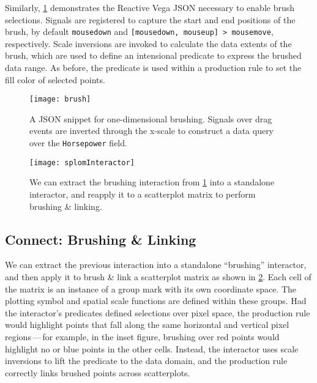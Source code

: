 Similarly, \cref{fig:vg:brush} demonstrates the Reactive Vega JSON necessary to
enable brush selections. Signals are registered to capture the start and end
positions of the brush, by default \texttt{mousedown} and \texttt{[mousedown,
mouseup] > mousemove}, respectively. Scale inversions are invoked to calculate
the data extents of the brush, which are used to define an intensional predicate
to express the brushed data range. As before, the predicate is used within a
production rule to set the fill color of selected points.

\begin{figure}[h!]
  \centering
  \texttt{[image: brush]}
  \caption{A JSON snippet for one-dimensional brushing. Signals over drag
  events are inverted through the x-scale to construct a data query over the
  \texttt{Horsepower} field.}
  \label{fig:vg:brush}
\end{figure}

\begin{figure}[h!]
  \centering
  \texttt{[image: splomInteractor]}
  \caption{We can extract the brushing interaction from \cref{fig:vg:brush}
  into a standalone interactor, and reapply it to a scatterplot matrix to
  perform brushing \& linking.}
  \label{fig:vg:splomInteractor}
\end{figure}

\subsection{Connect: Brushing \& Linking}

\vspace{-7pt}


We can extract the previous interaction into a standalone ``brushing''
interactor, and then apply it to brush \& link a scatterplot matrix as shown in
\cref{fig:vg:splomInteractor}. Each cell of the matrix is an instance of a group
mark with its own coordinate space. The plotting symbol and spatial scale
functions are defined within these groups. Had the interactor's predicates
defined selections over pixel space, the production rule would highlight points
that fall along the same horizontal and vertical pixel regions\,---\,for
example, in the inset figure, brushing over red points would highlight no or
blue points in the other cells. Instead, the interactor uses scale inversions to
lift the predicate to the data domain, and the production rule correctly links
brushed points across scatterplots.

